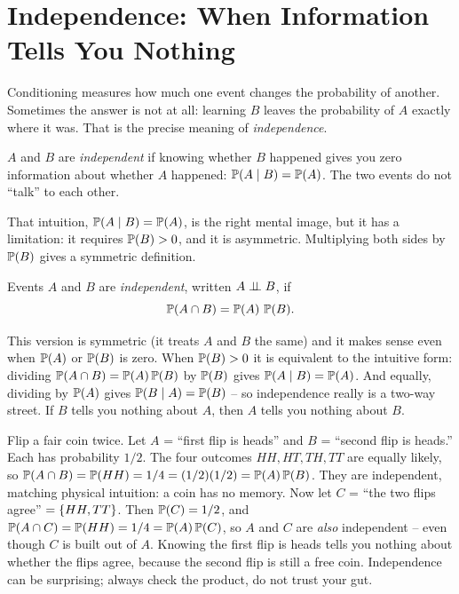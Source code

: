 \section{Independence: When Information Tells You Nothing}
\label{ch04:independence}

Conditioning measures how much one event changes the probability of another. Sometimes the answer is not at all: learning $B$ leaves the probability of $A$ exactly where it was. That is the precise meaning of \emph{independence}.

\begin{intuitionbox}
$A$ and $B$ are \emph{independent} if knowing whether $B$ happened gives you zero information about whether $A$ happened: $\P(A\given B) = \P(A)$. The two events do not ``talk'' to each other.
\end{intuitionbox}

That intuition, $\P(A \given B) = \P(A)$, is the right mental image, but it has a limitation: it requires $\P(B) > 0$, and it is asymmetric. Multiplying both sides by $\P(B)$ gives a symmetric definition.

\begin{definition}
\label{ch04:def-indep}
Events $A$ and $B$ are \emph{independent}, written $A \indep B$, if
\[
\P(A \cap B) = \P(A)\,\P(B).
\]
\end{definition}

This version is symmetric (it treats $A$ and $B$ the same) and it makes sense even when $\P(A)$ or $\P(B)$ is zero. When $\P(B) > 0$ it is equivalent to the intuitive form: dividing $\P(A\cap B) = \P(A)\P(B)$ by $\P(B)$ gives $\P(A\given B) = \P(A)$. And equally, dividing by $\P(A)$ gives $\P(B\given A) = \P(B)$ -- so independence really is a two-way street. If $B$ tells you nothing about $A$, then $A$ tells you nothing about $B$.

\begin{example}
\label{ch04:ex-two-coins}
Flip a fair coin twice. Let $A$ = ``first flip is heads'' and $B$ = ``second flip is heads.'' Each has probability $1/2$. The four outcomes $HH, HT, TH, TT$ are equally likely, so $\P(A\cap B) = \P(HH) = 1/4 = (1/2)(1/2) = \P(A)\P(B)$. They are independent, matching physical intuition: a coin has no memory. Now let $C$ = ``the two flips agree'' $= \set{HH, TT}$. Then $\P(C) = 1/2$, and $\P(A \cap C) = \P(HH) = 1/4 = \P(A)\P(C)$, so $A$ and $C$ are \emph{also} independent -- even though $C$ is built out of $A$. Knowing the first flip is heads tells you nothing about whether the flips agree, because the second flip is still a free coin. Independence can be surprising; always check the product, do not trust your gut.
\end{example}

